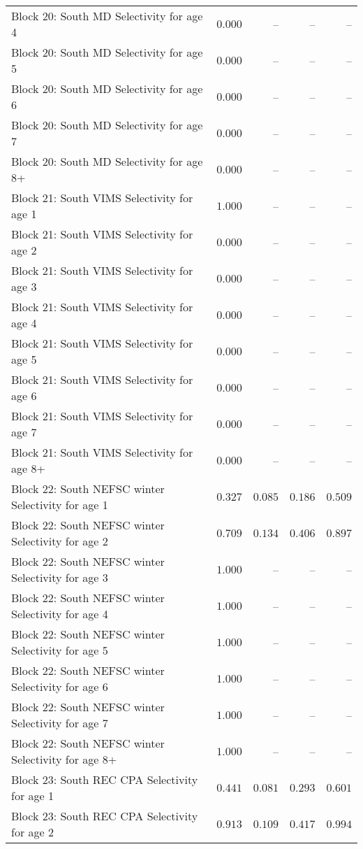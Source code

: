 \documentclass[
]{article}
\begin{document}
\begin{landscape}
\begin{longtable}[t]{lrrrr}
Block 20: South MD Selectivity for age 4 & $0.000$ & -- & -- & --\\
Block 20: South MD Selectivity for age 5 & $0.000$ & -- & -- & --\\
Block 20: South MD Selectivity for age 6 & $0.000$ & -- & -- & --\\
Block 20: South MD Selectivity for age 7 & $0.000$ & -- & -- & --\\
\addlinespace
Block 20: South MD Selectivity for age 8+ & $0.000$ & -- & -- & --\\
Block 21: South VIMS Selectivity for age 1 & $1.000$ & -- & -- & --\\
Block 21: South VIMS Selectivity for age 2 & $0.000$ & -- & -- & --\\
Block 21: South VIMS Selectivity for age 3 & $0.000$ & -- & -- & --\\
Block 21: South VIMS Selectivity for age 4 & $0.000$ & -- & -- & --\\
\addlinespace
Block 21: South VIMS Selectivity for age 5 & $0.000$ & -- & -- & --\\
Block 21: South VIMS Selectivity for age 6 & $0.000$ & -- & -- & --\\
Block 21: South VIMS Selectivity for age 7 & $0.000$ & -- & -- & --\\
Block 21: South VIMS Selectivity for age 8+ & $0.000$ & -- & -- & --\\
Block 22: South NEFSC winter Selectivity for age 1 & $0.327$ & $0.085$ & $0.186$ & $0.509$\\
\addlinespace
Block 22: South NEFSC winter Selectivity for age 2 & $0.709$ & $0.134$ & $0.406$ & $0.897$\\
Block 22: South NEFSC winter Selectivity for age 3 & $1.000$ & -- & -- & --\\
Block 22: South NEFSC winter Selectivity for age 4 & $1.000$ & -- & -- & --\\
Block 22: South NEFSC winter Selectivity for age 5 & $1.000$ & -- & -- & --\\
Block 22: South NEFSC winter Selectivity for age 6 & $1.000$ & -- & -- & --\\
\addlinespace
Block 22: South NEFSC winter Selectivity for age 7 & $1.000$ & -- & -- & --\\
Block 22: South NEFSC winter Selectivity for age 8+ & $1.000$ & -- & -- & --\\
Block 23: South REC CPA Selectivity for age 1 & $0.441$ & $0.081$ & $0.293$ & $0.601$\\
Block 23: South REC CPA Selectivity for age 2 & $0.913$ & $0.109$ & $0.417$ & $0.994$\\

\end{longtable}
\end{landscape}
\end{document}
